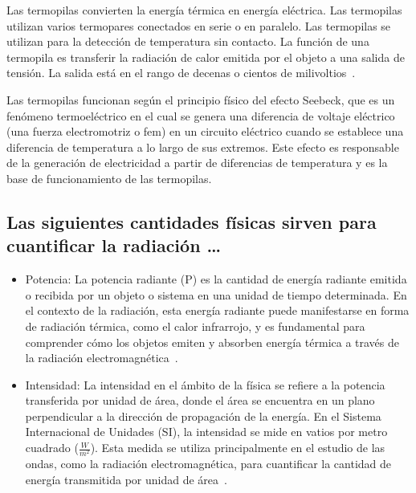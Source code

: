 \documentclass[twocolumn, 12pt]{article}
\begin{document}
Las termopilas convierten la energía térmica en energía
eléctrica. Las termopilas utilizan varios termopares
conectados en serie o en paralelo. Las termopilas se
utilizan para la detección de temperatura sin contacto. La
función de una termopila es transferir la radiación de
calor emitida por el objeto a una salida de tensión. La
salida está en el rango de decenas o cientos de
milivoltios~\cite{Termopilas}.

Las termopilas funcionan según el principio físico del
efecto Seebeck, que es un fenómeno termoeléctrico en el
cual se genera una diferencia de voltaje eléctrico (una
fuerza electromotriz o fem) en un circuito eléctrico cuando
se establece una diferencia de temperatura a lo largo de
sus extremos. Este efecto es responsable de la generación
de electricidad a partir de diferencias de temperatura y es
la base de funcionamiento de las termopilas.

\subsection{Las siguientes cantidades físicas sirven para cuantificar la radiación \dots}

\begin{itemize}[label=$\triangleright$]
    \item Potencia: La potencia radiante (P) es la cantidad de
          energía radiante emitida o recibida por un objeto o sistema
          en una unidad de tiempo determinada. En el contexto de la
          radiación, esta energía radiante puede manifestarse en
          forma de radiación térmica, como el calor infrarrojo, y es
          fundamental para comprender cómo los objetos emiten y
          absorben energía térmica a través de la radiación
          electromagnética~\cite{Potencia}.

    \item Intensidad: La intensidad en el ámbito de la física se
          refiere a la potencia transferida por unidad de área, donde
          el área se encuentra en un plano perpendicular a la
          dirección de propagación de la energía. En el Sistema
          Internacional de Unidades (SI), la intensidad se mide en
          vatios por metro cuadrado ($\frac{W}{m^2}$). Esta medida se
          utiliza principalmente en el estudio de las ondas, como la
          radiación electromagnética, para cuantificar la cantidad de
          energía transmitida por unidad de área~\cite{Intensidad}.
\end{itemize}
\end{document}
